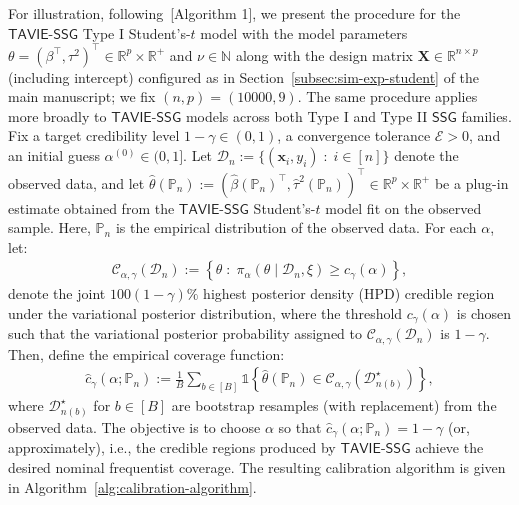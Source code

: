 \documentclass[12pt]{article}
\numberwithin{equation}{section}
\newcommand{\ssg}{\mathsf{SSG}}
\newcommand{\tssg}{\mathsf{TAVIE}\text{-}\mathsf{SSG}}
\begin{document}
{For illustration, following~\cite{SyringMartin2019}[Algorithm 1], we present the procedure for the $\tssg$ Type I Student's-$t$ model with the model parameters $\theta = (\beta^{\top}, \tau^{2})^{\top}\in \mathbb{R}^p \times \mathbb{R}^{+}$ and $\nu\in \mathbb{N}$ along with the design matrix $\mathbf{X}\in \mathbb{R}^{n\times p}$ (including intercept) configured as in Section~\ref{subsec:sim-exp-student} of the main manuscript; we fix $(n, p) = (10000, 9)$. The same procedure applies more broadly to $\tssg$ models across both Type I and Type II $\ssg$ families. Fix a target credibility level $1-\gamma \in (0, 1)$, a convergence tolerance $\mathcal{E} > 0$, and an initial guess $\alpha^{(0)}\in (0, 1]$. Let $\mathcal{D}_n := \{(\mathbf{x}_i, y_i)\;:\;i\in [n]\}$ denote the observed data, and let $\widehat{\theta}(\mathbb P_n) := (\widehat{\beta}(\mathbb P_n)^{\top}, \widehat{\tau}^{2}(\mathbb{P}_n))^{\top}\in \mathbb{R}^{p}\times \mathbb{R}^{+}$ be a plug-in estimate obtained from the $\tssg$ Student's-$t$ model fit on the observed sample. Here, $\mathbb{P}_n$ is the empirical distribution of the observed data. For each $\alpha$, let:
\begin{align}
\label{eq:calibration-1}
\mathcal{C}_{\alpha, \gamma}(\mathcal D_n) := \left\{\theta\;:\; \pi_{\alpha}(\theta\mid \mathcal{D}_n, \xi)\geq c_{\gamma}(\alpha)\right\},
\end{align}
denote the joint $100(1-\gamma)\%$ highest posterior density (HPD) credible region under the variational posterior distribution, where the threshold $c_{\gamma}(\alpha)$ is chosen such that the variational posterior probability assigned to $\mathcal{C}_{\alpha, \gamma}(\mathcal{D}_n)$ is $1-\gamma$. Then, define the empirical coverage function:
\begin{align}
\label{eq:calibration-2}
\widehat{c}_{\gamma}(\alpha; \mathbb{P}_n) := \frac{1}{B}\sum_{b\in [B]} \mathds{1}\left\{\widehat{\theta}(\mathbb{P}_n) \in \mathcal{C}_{\alpha, \gamma}(\mathcal{D}^{\star}_{n(b)})\right\},
\end{align}
where $\mathcal{D}^{\star}_{n(b)}$ for $b\in [B]$ are bootstrap resamples (with replacement) from the observed data. The objective is to choose $\alpha$ so that $\widehat{c}_{\gamma}(\alpha; \mathbb P_n) = 1-\gamma$ (or, approximately), i.e., the credible regions produced by $\tssg$ achieve the desired nominal frequentist coverage. The resulting calibration algorithm is given in Algorithm~\ref{alg:calibration-algorithm}.

{
\renewcommand{\baselinestretch}{1.0}\normalsize
\begin{algorithm}[H]
\caption{Calibrating $\alpha \in (0,1]$ for the $\tssg$ Type I Student's-$t$ model}
\label{alg:calibration-algorithm}
\DontPrintSemicolon


\end{algorithm}}}
\end{document}
